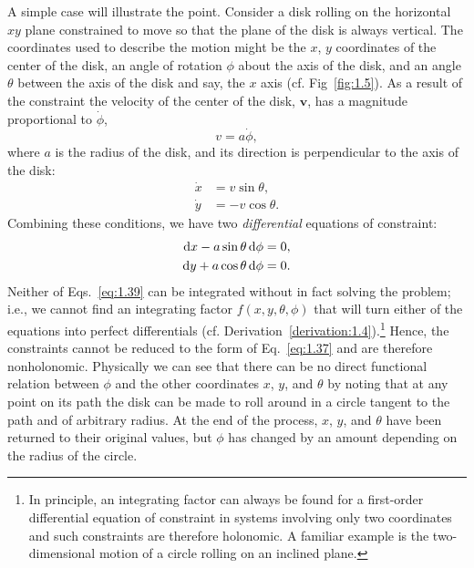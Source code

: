 A simple case will illustrate the point. Consider a disk rolling on the horizontal \(xy\) plane constrained to move so that the plane of the disk is always vertical. The coordinates used to describe the motion might be the \(x\), \(y\) coordinates of the center of the disk, an angle of rotation \(\phi\) about the axis of the disk, and an angle \(\theta\) between the axis of the disk and say, the \(x\) axis (cf. Fig~\ref{fig:1.5}). As a result of the constraint the velocity of the center of the disk, \(\symbf{v}\), has a magnitude proportional to \(\dot{\phi}\),
\begin{equation*}
    v=a\dot{\phi},
\end{equation*}
where \(a\) is the radius of the disk, and its direction is perpendicular to the axis of the disk:
\begin{equation*}
    \begin{aligned}
        \dot{x}&=v\sin\theta,\\
        \dot{y}&=-v\cos\theta.
    \end{aligned}
\end{equation*}
Combining these conditions, we have two \emph{differential} equations of constraint:
\begin{equation}
    \begin{aligned}
        \odif{x}-a\sin\theta\odif{\phi}&=0,\\
        \odif{y}+a\cos\theta\odif{\phi}&=0.
    \end{aligned}
    \label{eq:1.39}
\end{equation}
Neither of Eqs.~\eqref{eq:1.39} can be integrated without in fact solving the problem; i.e., we cannot find an integrating factor \(f\left(x,y,\theta,\phi\right)\) that will turn either of the equations into perfect differentials (cf. Derivation~\ref{derivation:1.4}).\footnote{In principle, an integrating factor can always be found for a first-order differential equation of constraint in systems involving only two coordinates and such constraints are therefore holonomic. A familiar example is the two-dimensional motion of a circle rolling on an inclined plane.} Hence, the constraints cannot be reduced to the form of Eq.~\eqref{eq:1.37} and are therefore nonholonomic. Physically we can see that there can be no direct functional relation between \(\phi\) and the other coordinates \(x\), \(y\), and \(\theta\) by noting that at any point on its path the disk can be made to roll around in a circle tangent to the path and of arbitrary radius. At the end of the process, \(x\), \(y\), and \(\theta\) have been returned to their original values, but \(\phi\) has changed by an amount depending on the radius of the circle.

